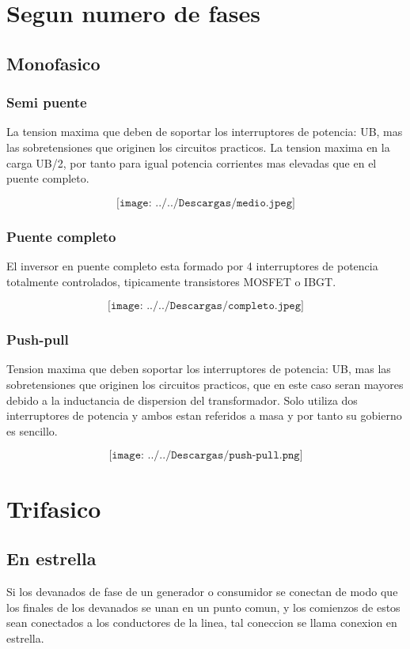 \documentclass[12pt,a4paper]{report}
\begin{document}
\section{Segun numero de fases}
\subsection{Monofasico}
\subsubsection{Semi puente}
La tension maxima que deben de soportar los interruptores de potencia: UB, mas las sobretensiones que originen los circuitos practicos.
La tension maxima en la carga UB/2, por tanto para igual potencia corrientes mas elevadas que en el puente completo.

$$\texttt{[image: ../../Descargas/medio.jpeg]} $$

\subsubsection{Puente completo}
El inversor en puente completo esta formado por 4 interruptores de potencia totalmente controlados, tipicamente transistores MOSFET o IBGT.

$$\texttt{[image: ../../Descargas/completo.jpeg]}$$
\subsubsection{Push-pull}
Tension maxima que deben soportar los interruptores de potencia: UB, mas las sobretensiones que originen los circuitos practicos, que en este caso seran mayores debido a la inductancia de dispersion del transformador.
Solo utiliza dos interruptores de potencia y ambos estan referidos a masa y por tanto su gobierno es sencillo.

$$\texttt{[image: ../../Descargas/push-pull.png]} $$
\section{Trifasico}
\subsection{En estrella}
Si los devanados de fase de un generador o consumidor se conectan de modo que los finales de los devanados se unan en un punto comun, y los comienzos de estos sean conectados a los conductores de la linea, tal coneccion se llama conexion en estrella.
\end{document}
